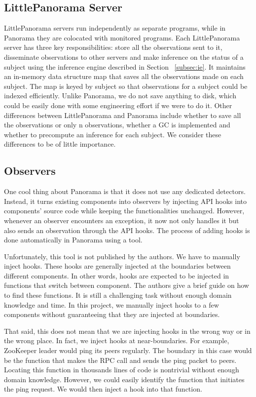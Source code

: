 \subsection{LittlePanorama Server}
LittlePanorama servers run independently as separate programs, while in Panorama they are colocated with monitored programs. Each LittlePanorama server has three key responsibilities: store all the observations sent to it, disseminate observations to other servers and make inference on the status of a subject using the inference engine described in Section ~\ref{subsec:ie}. It maintains an in-memory data structure map that saves all the observations made on each subject. The map is keyed by subject so that observations for a subject could be indexed efficiently. Unlike Panorama, we do not save anything to disk, which could be easily done with some engineering effort if we were to do it. Other differences between LittlePanorama and Panorama include whether to save all the observations or only n observations, whether a GC is implemented and whether to precompute an inference for each subject. We consider these differences to be of little importance. 

\subsection{Observers}
\label{subsec:observers}
One cool thing about Panorama is that it does not use any dedicated detectors. Instead, it turns existing components into observers by injecting API hooks into components' source code while keeping the functionalities unchanged. However, whenever an observer encounters an exception, it now not only handles it but also sends an observation through the API hooks. The process of adding hooks is done automatically in Panorama using a tool. 

Unfortunately, this tool is not published by the authors. We have to manually inject hooks. These hooks are generally injected at the boundaries between different components. In other words, hooks are expected to be injected in functions that switch between component. The authors give a brief guide on how to find these functions. It is still a challenging task without enough domain knowledge and time. In this project, we manually inject hooks to a few components without guaranteeing that they are injected at boundaries. 

That said, this does not mean that we are injecting hooks in the wrong way or in the wrong place. In fact, we inject hooks at near-boundaries. For example, ZooKeeper leader would ping its peers regularly. The boundary in this case would be the function that makes the RPC call and sends the ping packet to peers. Locating this function in thousands lines of code is nontrivial without enough domain knowledge. However, we could easily identify the function that initiates the ping request. We would then inject a hook into that function. 



